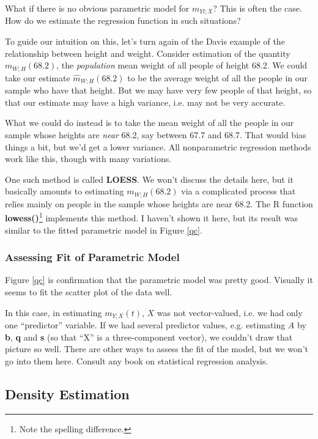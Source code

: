 What if there is no obvious parametric model for $m_{Yl;X}$?  This is
often the case.  How do we estimate the regression function in such
situations?

To guide our intuition on this, let's turn again of the Davis example of
the relationship between height and weight.  Consider estimation of the
quantity $m_{W;H}(68.2)$, the {\it population} mean weight of all people
of height 68.2.  We could take our estimate $\hat{m}_{W;H}(68.2)$ to be
the average weight of all the people in our sample who have that height.
But we may have very few people of that height, so that our estimate may
have a high variance, i.e. may not be very accurate.

What we could do instead is to take the mean weight of all the people in
our sample whose heights are {\it near} 68.2, say between 67.7 and 68.7.
That would bias things a bit, but we'd get a lower variance.  All
nonparametric regression methods work like this, though with many
variations.

One such method is called {\bf LOESS}.  We won't discuss the details
here, but it basically amounts to estimating $m_{W;H}(68.2)$ via a
complicated process that relies mainly on people in the sample whose
heights are near 68.2.  The R function {\bf lowess()}\footnote{Note the
spelling difference.} implements this method.  I haven't shown it here,
but its result was similar to the fitted parametric model in Figure
\ref{qc}.  

\subsubsection{Assessing Fit of Parametric Model}

Figure \ref{qc} is confirmation that the parametric model was pretty
good.  Visually it seems to fit the scatter plot of the data well.

In this case, in estimating $m_{Y;X}(t)$, $X$ was not vector-valued,
i.e. we had only one ``predictor'' variable.  If we had several
predictor values, e.g. estimating $A$ by {\bf b}, {\bf q} and {\bf s}
(so that ``X'' is a three-component vector), we couldn't draw that
picture so well.  There are other ways to assess the fit of the model,
but we won't go into them here.  Consult any book on statistical
regression analysis.

\subsection{Density Estimation} 

